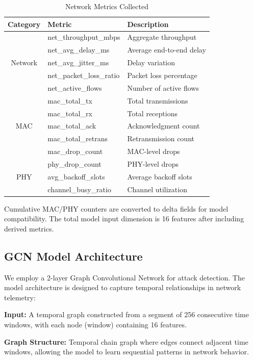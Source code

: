 \documentclass[conference]{IEEEtran}
\begin{document}
\begin{table}[htbp]
\caption{Network Metrics Collected}
\label{tab:metrics}
\centering
\begin{tabular}{|c|l|l|}
\hline
\textbf{Category} & \textbf{Metric} & \textbf{Description} \\
\hline
\multirow{5}{*}{Network} & net\_throughput\_mbps & Aggregate throughput \\
 & net\_avg\_delay\_ms & Average end-to-end delay \\
 & net\_avg\_jitter\_ms & Delay variation \\
 & net\_packet\_loss\_ratio & Packet loss percentage \\
 & net\_active\_flows & Number of active flows \\
\hline
\multirow{5}{*}{MAC} & mac\_total\_tx & Total transmissions \\
 & mac\_total\_rx & Total receptions \\
 & mac\_total\_ack & Acknowledgment count \\
 & mac\_total\_retrans & Retransmission count \\
 & mac\_drop\_count & MAC-level drops \\
\hline
\multirow{3}{*}{PHY} & phy\_drop\_count & PHY-level drops \\
 & avg\_backoff\_slots & Average backoff slots \\
 & channel\_busy\_ratio & Channel utilization \\
\hline
\end{tabular}
\end{table}

Cumulative MAC/PHY counters are converted to delta fields for model compatibility. The total model input dimension is 16 features after including derived metrics.

\subsection{GCN Model Architecture}

We employ a 2-layer Graph Convolutional Network for attack detection. The model architecture is designed to capture temporal relationships in network telemetry:

\textbf{Input:} A temporal graph constructed from a segment of 256 consecutive time windows, with each node (window) containing 16 features.

\textbf{Graph Structure:} Temporal chain graph where edges connect adjacent time windows, allowing the model to learn sequential patterns in network behavior.
\end{document}
